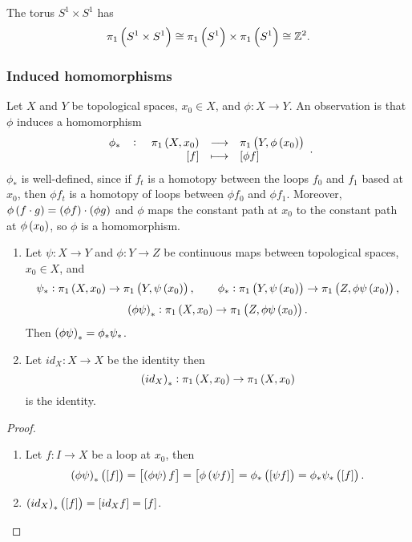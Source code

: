 \begin{example*}
The torus $ S^1 \times S^1 $ has
$$ \pi_1\br{S^1 \times S^1} \cong \pi_1\br{S^1} \times \pi_1\br{S^1} \cong \Z^2. $$
\end{example*}

\pagebreak

\subsubsection{Induced homomorphisms}

Let $ X $ and $ Y $ be topological spaces, $ x_0 \in X $, and $ \phi : X \to Y $. An observation is that $ \phi $ induces a homomorphism
$$ \function[\phi_*]{\pi_1\br{X, x_0}}{\pi_1\br{Y, \phi\br{x_0}}}{\sbr{f}}{\sbr{\phi f}}. $$
$ \phi_* $ is well-defined, since if $ f_t $ is a homotopy between the loops $ f_0 $ and $ f_1 $ based at $ x_0 $, then $ \phi f_t $ is a homotopy of loops between $ \phi f_0 $ and $ \phi f_1 $. Moreover, $ \phi\br{f \cdot g} = \br{\phi f} \cdot \br{\phi g} $ and $ \phi $ maps the constant path at $ x_0 $ to the constant path at $ \phi\br{x_0} $, so $ \phi $ is a homomorphism.

\begin{proposition}
\hfill
\begin{enumerate}
\item Let $ \psi : X \to Y $ and $ \phi : Y \to Z $ be continuous maps between topological spaces, $ x_0 \in X $, and
$$ \psi_* : \pi_1\br{X, x_0} \to \pi_1\br{Y, \psi\br{x_0}}, \qquad \phi_* : \pi_1\br{Y, \psi\br{x_0}} \to \pi_1\br{Z, \phi\psi\br{x_0}}, $$
$$ \br{\phi\psi}_* : \pi_1\br{X, x_0} \to \pi_1\br{Z, \phi\psi\br{x_0}}. $$
Then $ \br{\phi\psi}_* = \phi_*\psi_* $.
\item Let $ id_X : X \to X $ be the identity then
$$ \br{id_X}_* : \pi_1\br{X, x_0} \to \pi_1\br{X, x_0} $$
is the identity.
\end{enumerate}
\end{proposition}

\begin{proof}
\hfill
\begin{enumerate}
\item Let $ f : I \to X $ be a loop at $ x_0 $, then
$$ \br{\phi\psi}_*\br{\sbr{f}} = \sbr{\br{\phi\psi}f} = \sbr{\phi\br{\psi f}} = \phi_*\br{\sbr{\psi f}} = \phi_*\psi_*\br{\sbr{f}}. $$
\item $ \br{id_X}_*\br{\sbr{f}} = \sbr{id_Xf} = \sbr{f} $.
\end{enumerate}
\end{proof}

